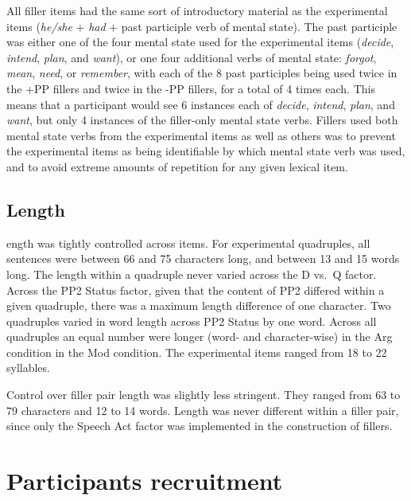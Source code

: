\documentclass[12pt,oneside]{book}
\begin{document}
All filler items had the same sort of introductory material as the experimental items (\emph{he/she} + \emph{had} + past participle verb of mental state). The past participle was either one of the four mental state  used for the experimental items (\emph{decide}, \emph{intend}, \emph{plan}, and \emph{want}), or one  four additional verbs of mental state: \emph{forgot}, \emph{mean}, \emph{need}, or \emph{remember}, with each of the 8 past participles being used twice in the +PP fillers and twice in the -PP fillers, for a total of 4 times each. This means that a participant would see 6 instances each of \emph{decide}, \emph{intend}, \emph{plan}, and \emph{want},  but only 4 instances of the filler-only mental state verbs. Fillers used both mental state verbs from the experimental items as well as others was  to prevent the experimental items as being identifiable by which mental state verb was used, and to avoid extreme amounts of repetition for any given lexical item.

\hypertarget{length}{%
\subsection{Length}\label{length}}

ength was tightly controlled across items. For experimental quadruples, all sentences were between 66 and 75 characters long, and between 13 and 15 words long. The length within a quadruple never varied across the D vs.~Q factor. Across the PP2 Status factor, given that the content of PP2 differed within a given quadruple, there was a maximum length difference of one character. Two quadruples varied in word length across PP2 Status by one word. Across all quadruples an equal number were longer (word- and character-wise) in the Arg condition  in the Mod condition. The experimental items ranged from 18 to 22 syllables.

Control over filler pair length was slightly less stringent. They ranged from 63 to 79 characters and 12 to 14 words. Length was never different within a filler pair, since only the Speech Act factor was implemented in the construction of fillers.

\hypertarget{participants-recruitment}{%
\section{Participants recruitment}\label{participants-recruitment}}
\end{document}
